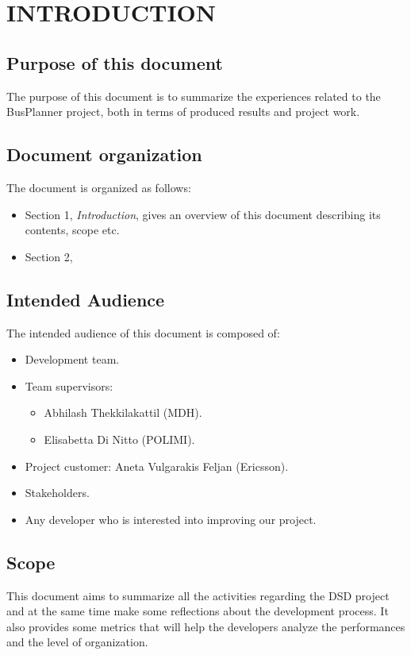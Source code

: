 \section{INTRODUCTION} 
\subsection{Purpose of this document}
The purpose of this document is to summarize the experiences related to the BusPlanner project, both in terms of produced results and project work.

\subsection{Document organization}
The document is organized as follows:
\begin{itemize}
	\item Section 1, \textit{Introduction}, gives an overview of this document describing its contents, scope etc.
	\item Section 2, \textit{}
\end{itemize}

\subsection{Intended Audience}
The intended audience of this document is composed of:
\begin{itemize}
	\item Development team.
	\item Team supervisors:
	\begin{itemize}
		\item Abhilash Thekkilakattil (MDH).
		\item Elisabetta Di Nitto (POLIMI).
	\end{itemize}
	\item Project customer: Aneta Vulgarakis Feljan (Ericsson).
	\item Stakeholders.
	\item Any developer who is interested into improving our project.
\end{itemize}

\subsection{Scope}
This document aims to summarize all the activities regarding the DSD project and at the same time make some reflections about the development process. It also provides some metrics that will help the developers analyze the performances and the level of organization. 

